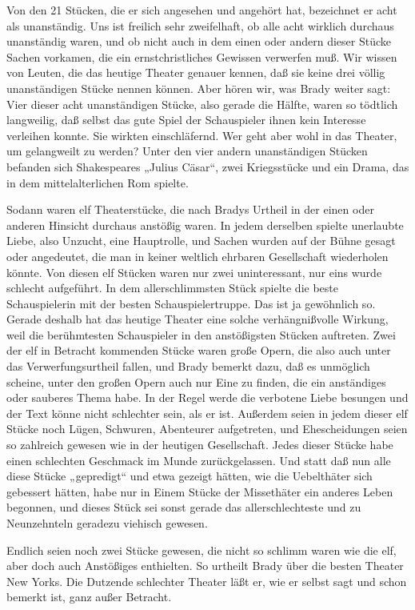 Von den 21 Stücken, die er sich angesehen und angehört hat, bezeichnet er acht als unanständig. Uns ist freilich sehr zweifelhaft, ob alle acht wirklich durchaus unanständig waren, und ob nicht auch in dem einen oder andern dieser Stücke Sachen vorkamen, die ein ernstchristliches Gewissen verwerfen muß. Wir wissen von Leuten, die das heutige Theater genauer kennen, daß sie keine drei völlig unanständigen Stücke nennen können. Aber hören wir, was Brady weiter sagt: Vier dieser acht unanständigen Stücke, also gerade die Hälfte, waren so tödtlich langweilig, daß selbst das gute Spiel der Schauspieler ihnen kein Interesse verleihen konnte. Sie wirkten einschläfernd. Wer geht aber wohl in das Theater, um gelangweilt zu werden? Unter den vier andern unanständigen Stücken befanden sich Shakespeares „Julius Cäsar“, zwei Kriegsstücke und ein Drama, das in dem mittelalterlichen Rom spielte.

Sodann waren elf Theaterstücke, die nach Bradys Urtheil in der einen oder anderen Hinsicht durchaus anstößig waren. In jedem derselben spielte unerlaubte Liebe, also Unzucht, eine Hauptrolle, und Sachen wurden auf der Bühne gesagt oder angedeutet, die man in keiner weltlich ehrbaren Gesellschaft wiederholen könnte. Von diesen elf Stücken waren nur zwei uninteressant, nur eins wurde schlecht aufgeführt. In dem allerschlimmsten Stück spielte die beste Schauspielerin mit der besten Schauspielertruppe. Das ist ja gewöhnlich so. Gerade deshalb hat das heutige Theater eine solche verhängnißvolle Wirkung, weil die berühmtesten Schauspieler in den anstößigsten Stücken auftreten. Zwei der elf in Betracht kommenden Stücke waren große Opern, die also auch unter das Verwerfungsurtheil fallen, und Brady bemerkt dazu, daß es unmöglich scheine, unter den großen Opern auch nur Eine zu finden, die ein anständiges oder
sauberes Thema habe. In der Regel werde die verbotene Liebe besungen und der Text könne nicht schlechter sein, als er ist. Außerdem seien in jedem dieser elf Stücke noch Lügen, Schwuren, Abenteurer aufgetreten, und Ehescheidungen seien so zahlreich gewesen wie in der heutigen Gesellschaft. Jedes dieser Stücke habe einen schlechten Geschmack im Munde zurückgelassen. Und statt daß nun alle diese Stücke „gepredigt“ und etwa gezeigt hätten, wie die Uebelthäter sich gebessert hätten, habe nur in Einem Stücke der Missethäter ein anderes Leben begonnen, und dieses Stück sei sonst gerade das allerschlechteste und zu Neunzehnteln geradezu viehisch gewesen.

Endlich seien noch zwei Stücke gewesen, die nicht so schlimm waren wie die elf, aber doch auch Anstößiges enthielten. So urtheilt Brady über die besten Theater New Yorks. Die Dutzende schlechter Theater läßt er, wie er selbst sagt und schon bemerkt ist, ganz außer Betracht.

